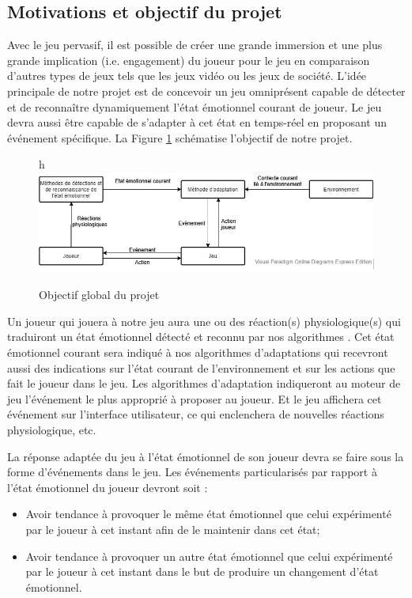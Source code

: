 \documentclass[11pt]{article}
\begin{document}
	\subsection{Motivations et objectif du projet}\label{sec:objectif}
		Avec le jeu pervasif, il est possible de créer une grande immersion et une plus grande implication (i.e. engagement) du joueur pour le jeu en comparaison d'autres types de jeux tels que les jeux vidéo ou les jeux de société.
		L'idée principale de notre projet est de concevoir un jeu omniprésent capable de détecter et de reconnaître dynamiquement l'état émotionnel courant de joueur.
		Le jeu devra aussi être capable de s'adapter à cet état en temps-réel en proposant un événement spécifique.
		La Figure \ref{fig:motivation} schématise l'objectif de notre projet.
		\begin{figure}{h}
			\centering
			\includegraphics[scale=0.75]{../include/motivation.jpg}
			\caption{Objectif global du projet}
			\label{fig:motivation}
		\end{figure}
		Un joueur qui jouera à notre jeu aura une ou des réaction(s) physiologique(s) qui traduiront un état émotionnel détecté et reconnu par nos algorithmes \cite{gal_2019,gal_et_al._2020}.
		Cet état émotionnel courant sera indiqué à nos algorithmes d'adaptations qui recevront aussi des indications sur l'état courant de l'environnement et sur les actions que fait le joueur dans le jeu.
		Les algorithmes d'adaptation indiqueront au moteur de jeu l'événement le plus approprié à proposer au joueur.
		Et le jeu affichera cet événement sur l'interface utilisateur, ce qui enclenchera de nouvelles réactions physiologique, etc.\par
		La réponse adaptée du jeu à l'état émotionnel de son joueur devra se faire sous la forme d'événements dans le jeu.
		Les événements particularisés par rapport à l'état émotionnel du joueur devront soit :
		\begin{itemize}
			\item Avoir tendance à provoquer le même état émotionnel que celui expérimenté par le joueur à cet instant afin de le maintenir dans cet état;
			\item Avoir tendance à provoquer un autre état émotionnel que celui expérimenté par le joueur à cet instant dans le but de produire un changement d'état émotionnel.
		\end{itemize}
\end{document}

